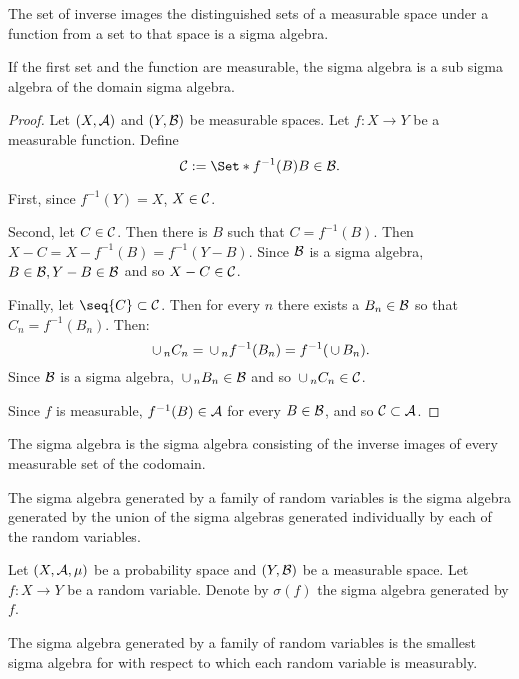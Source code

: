 \begin{prop}

The set of inverse images
the distinguished sets
of a measurable space under
a function from a set to
that space is a sigma algebra.

If the first set and the
function are measurable,
the sigma algebra is a sub
sigma algebra of the domain
sigma algebra.

\begin{proof}
  Let $(X, \mathcal{A})$
  and $(Y, \mathcal{B})$ be
  measurable spaces.
  Let $f: X \to Y$
  be a measurable function.
  Define
  \[
    \SC := \Set*{f^{-1}(B)}{B \in \SB}.
  \]

  First,
  since $f^{-1}(Y) = X$,
  $X \in \mathcal{C}$.

  Second, let $C \in \mathcal{C}$.
  Then there is $B$ such that
  $C = f^{-1}(B)$.
  Then $X - C = X - f^{-1}(B) = f^{-1}(Y - B)$.
  Since $\mathcal{B}$ is a sigma algebra,
  $B \in \mathcal{B}, Y - B \in \mathcal{B}$ and so
  $X - C \in \mathcal{C}$.

  Finally, let $\seq{C} \subset \SC$.
  Then for every $n$ there exists
  a $B_n \in \mathcal{B}$ so that $C_n = f^{-1}(B_n)$.
  Then:
  \[
    \,\cup\,_{n} C_n = \,\cup\,_n f^{-1}(B_n) = f^{-1}(\,\cup\, B_n).
  \]
  Since $\mathcal{B}$ is a sigma algebra,
  $\,\cup\,_n B_n \in \mathcal{B}$ and so $\,\cup\,_{n} C_n \in \mathcal{C}$.

  Since $f$ is measurable,
  $f^{-1}(B) \in \mathcal{A}$ for
  every $B \in \mathcal{B}$, and so $\mathcal{C} \subset \mathcal{A}$.
\end{proof}
\end{prop}

The sigma algebra
is the sigma algebra consisting
of the inverse images of every measurable
set of the codomain.

The sigma algebra generated
by a family of random variables
is the sigma algebra generated
by the union of the sigma algebras
generated individually by each
of the random variables.


Let $(X, \mathcal{A}, \mu)$ be a probability
space and $(Y, \mathcal{B})$ be a measurable
space.
Let $f: X \to Y$ be a random variable.
Denote by $\sigma(f)$ the
sigma algebra generated by $f$.


\begin{prop}
  The sigma algebra generated
  by a family of random variables
  is the smallest sigma algebra
  for with respect to which each
  random variable is measurably.
\end{prop}
\strats
